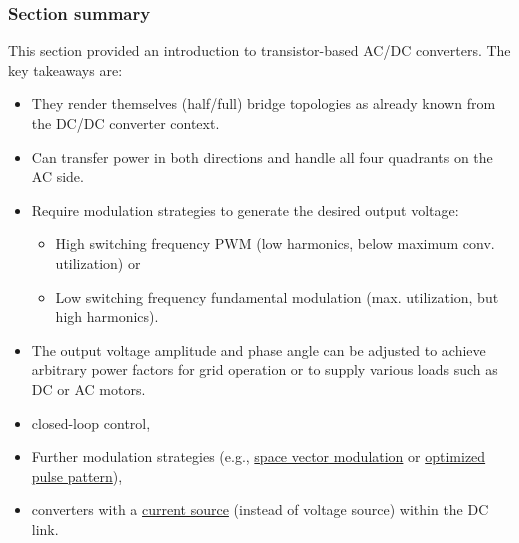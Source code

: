 \begin{frame}
	\frametitle{Section summary}
	This section provided an introduction to transistor-based AC/DC converters. The key takeaways are:
	\begin{itemize}
		\item<2-> They render themselves (half/full) bridge topologies as already known from the DC/DC converter context.
		\item<3-> Can transfer power in both directions and handle all four quadrants on the AC side.
		\item<4-> Require modulation strategies to generate the desired output voltage:
		      \begin{itemize}
			      \item<4-> High switching frequency PWM (low harmonics, below maximum conv. utilization) or
			      \item<5-> Low switching frequency fundamental modulation (max. utilization, but high harmonics).
		      \end{itemize}
		\item<6-> The output voltage amplitude and phase angle can be adjusted to achieve arbitrary power factors for grid operation or to supply various loads such as DC or AC motors.
	\end{itemize}
	\begin{itemize}
		\item<7-> closed-loop control,
		\item<8-> Further modulation strategies (e.g., \href{https://en.wikipedia.org/wiki/Space_vector_modulation}{space vector modulation}  or \href{https://doi.org/10.1109/TIE.2010.2047824}{optimized pulse pattern}),
		\item<9-> converters with a \href{https://en.wikipedia.org/wiki/Power_electronics\#Current_source_inverters}{current source}  (instead of voltage source) within the DC link.
	\end{itemize}
\end{frame}